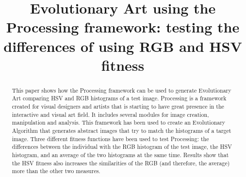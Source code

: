 \documentclass[conference]{IEEEtran}
\begin{document}
\title{Evolutionary Art using the Processing framework: testing the differences of using RGB and HSV fitness}
\author{
\and
{}
\and
{}
\and
{}
\and
{}
}

\maketitle

\begin{abstract}
This paper shows how the Processing framework can be used to generate
Evolutionary Art comparing HSV and RGB histograms of a test image. Processing is a framework created for visual
designers and artists that is starting to have great presence in the
interactive and visual art field. It includes several modules for
image creation, manipulation and analysis. This framework has been
used to create an Evolutionary Algorithm that generates abstract
images that try to match the histograms of a target image. Three different
fitness functions have been used to test Processing: the differences
between the individual with the RGB histogram of the test image, the
HSV histogram, and an average of the two histograms at the same
time. Results show that the HSV fitness also increases the similarities of the
RGB (and therefore, the average) more than the other two measures.  
\end{abstract}
\end{document}
